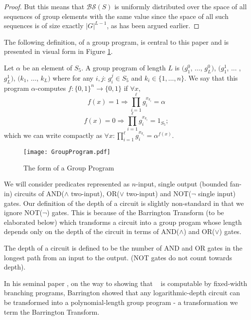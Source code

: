 \begin{proof}
But this  means that  $\mathcal{BS}(S)$ is uniformly  distributed over
the space of all sequences of group elements with the same value since
the space of all such sequences is of size exactly $|G|^{L-1}$, as has
been argued earlier.

\end{proof}

The following definition, of a group program, is central to this paper
and is presented in visual form in Figure \ref{fig:groupprogram}.

\begin{definition}
Let  $\alpha$  be an  element  of $S_5$.  A  group  program of  length
\emph{$L$}   is  $(g_{1}^{0}$,  $\ldots$,   $g_L^{0})$,  $(g_{1}^{1}$,
$\ldots$ ,$g_L^{1})$, $(k_{1}$, $\ldots$,  $k_L)$ where for any $i,j$:
$g_{i}^{j}  \in S_{5}$ and  $k_{i} \in  \{1,\ldots,n\}$.  We  say that
this program $\alpha$-computes  $f:\{0,1\}^{n} \rightarrow \{0,1\}$ if
$\forall x$,
\[ f(x)=1 \Rightarrow \prod ^{\ell} _{i=1} g_{i}^{x_{k_i}} = \alpha \]
\[ f(x)=0 \Rightarrow \prod ^{\ell} _{i=1} g_{i}^{x_{k_i}} = 1_{S_5}; \]
which  we can write  compactly as  $\forall x  : \prod  ^{\ell} _{i=1}
g_{i}^{x_{k_i}} = \alpha^{f(x)}$.
\end{definition}

\begin{figure}
\centering
\texttt{[image: GroupProgram.pdf]}
\vspace{-0.8in}
\caption{The form of a Group Program}
\label{fig:groupprogram}
\end{figure}

We will  consider predicates  represented as $n$-input,  single output
(bounded  fan-in)  circuits   of  AND($\wedge$  two-input),  OR($\vee$
two-input) and  NOT($\neg$ single input) gates. Our  definition of the
depth  of  a  circuit  is  slightly non-standard  in  that  we  ignore
NOT($\neg$) gates. This is because  of the Barrington Transform (to be
elaborated below) which transforms a circuit into a group progam whose
length  depends  only  on  the  depth  of  the  circuit  in  terms  of
AND($\wedge$) and OR($\vee$) gates.

\begin{definition}
The depth of a circuit is defined to be the number of AND and OR gates
in the  longest path from  an input to  the output. (NOT gates  do not
count towards depth).
\end{definition}

In his seminal paper \cite{B89}, on the way to showing that \NCone~ is
computable by  fixed-width branching programs,  Barrington showed that
any   logarithmic-depth   circuit    can   be   transformed   into   a
polynomial-length  group  program  -  a  transformation  we  term  the
Barrington Transform.

